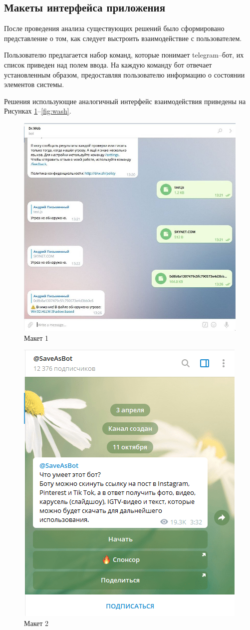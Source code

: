 \documentclass[utf8x]{G7-32} %
\begin{document}
\subsection{Макеты интерфейса приложения}

После проведения анализа существующих решений было сформировано представление о том, как следует выстроить взаимодействие с пользователем. 

Пользователю предлагается набор команд, которые понимает telegram--бот, их список приведен над полем ввода. На каждую команду бот отвечает установленным образом, предоставляя пользователю информацию о состоянии элементов системы. 

Решения использующие аналогичный интерфейс взаимодействия приведены на Рисунках \ref{fig:drewb}--\ref{fig:wash}.


\begin{figure}[h!]
	\centering
	\includegraphics[width=0.5\linewidth]{images/mokups/drewb}
	\caption{Макет 1}
	\label{fig:drewb}
\end{figure}

\begin{figure}[h!]
	\centering
	\includegraphics[width=0.5\linewidth]{images/mokups/saver}
	\caption{Макет 2}
	\label{fig:saver}
\end{figure}
\end{document}
